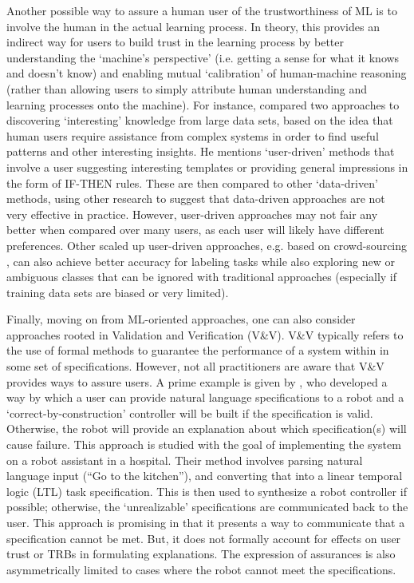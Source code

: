 Another possible way to assure a human user of the trustworthiness of ML is to involve the human in the actual learning process. 
In theory, this provides an indirect way for users to build trust in the learning process by better understanding the `machine's perspective' (i.e. getting a sense for what it knows and doesn't know) and enabling mutual `calibration' of human-machine reasoning (rather than allowing users to simply attribute human understanding and learning processes onto the machine). 
For instance, \citet{Freitas2006-qo} compared two approaches to discovering `interesting' knowledge from large data sets, based on the idea that human users require assistance from complex systems in order to find useful patterns and other interesting insights. 
He mentions `user-driven' methods that involve a user suggesting interesting templates or providing general impressions in the form of IF-THEN rules. 
These are then compared to other `data-driven' methods, using other research to suggest that data-driven approaches are not very effective in practice. 
However, user-driven approaches may not fair any better when compared over many users, as each user will likely have different preferences. 
Other scaled up user-driven approaches, e.g. based on crowd-sourcing \citet{Chang2017-kl}, can also achieve better accuracy for labeling tasks while also exploring new or ambiguous classes that can be ignored with traditional approaches (especially if training data sets are biased or very limited). 

Finally, moving on from ML-oriented approaches, one can also consider approaches rooted in Validation and Verification (V\&V). V\&V typically refers to the use of formal methods to guarantee the performance of a system within in some set of specifications. However, not all practitioners are aware that V\&V provides ways to assure users. A prime example is given by \citet{Raman2013-mz}, who developed a way by which a user can provide natural language specifications to a robot and a `correct-by-construction' controller will be built if the specification is valid. Otherwise, the robot will provide an explanation about which specification(s) will cause failure. This approach is studied with the goal of implementing the system on a robot assistant in a hospital. Their method involves parsing natural language input (``Go to the kitchen''), and converting that into a linear temporal logic (LTL) task specification. This is then used to synthesize a robot controller if possible; otherwise, the `unrealizable' specifications are communicated back to the user. This approach is promising in that it presents a way to communicate that a specification cannot be met. But, it does not formally account for effects on user trust or TRBs in formulating explanations. The expression of assurances is also asymmetrically limited to cases where the robot cannot meet the specifications. 

